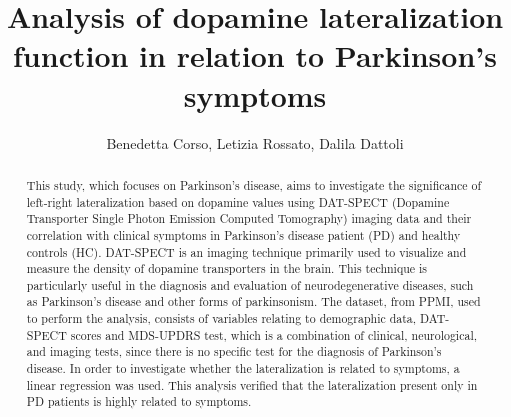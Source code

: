 \documentclass[]{article}
\title{Analysis of dopamine lateralization function in relation to Parkinson's symptoms}
\author{Benedetta Corso, Letizia Rossato, Dalila Dattoli}
\begin{document}
\maketitle

\begin{abstract}
This study, which focuses on Parkinson's disease, aims to investigate the significance of left-right lateralization based on dopamine values using DAT-SPECT (Dopamine Transporter Single Photon Emission Computed Tomography) imaging data and their correlation with clinical symptoms in Parkinson’s disease patient (PD) and healthy controls (HC). DAT-SPECT is an imaging technique primarily used to visualize and measure the density of dopamine transporters in the brain. This technique is particularly useful in the diagnosis and evaluation of neurodegenerative diseases, such as Parkinson's disease and other forms of parkinsonism. The dataset, from PPMI, used to perform the analysis, consists of variables relating to demographic data, DAT-SPECT scores and MDS-UPDRS test, which is a combination of clinical, neurological, and imaging tests, since there is no specific test for the diagnosis of Parkinson’s disease. In order to investigate whether the lateralization is related to symptoms, a linear regression was used. This analysis verified that the lateralization present only in PD patients is highly related to symptoms.
\newline

\end{abstract}
\end{document}
